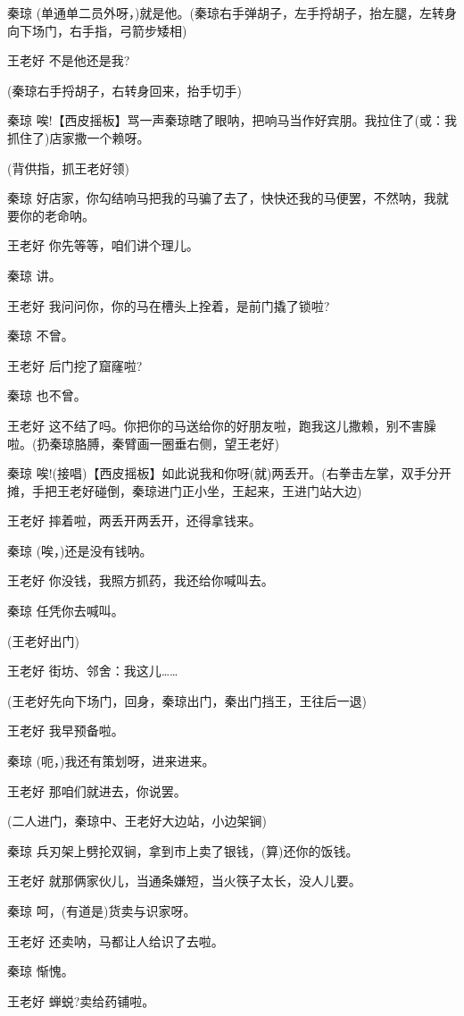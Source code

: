 秦琼
(单通单二员外呀，)就是他。(秦琼右手弹胡子，左手捋胡子，抬左腿，左转身向下场门，右手指，弓箭步矮相)

王老好 不是他还是我?

(秦琼右手捋胡子，右转身回来，抬手切手)

秦琼
唉!【西皮摇板】骂一声秦琼瞎了眼呐，把响马当作好宾朋。我拉住了(或：我抓住了)店家撒一个赖呀。

(背供指，抓王老好领)

秦琼
好店家，你勾结响马把我的马骗了去了，快快还我的马便罢，不然呐，我就要你的老命呐。

王老好 你先等等，咱们讲个理儿。

秦琼 讲。

王老好 我问问你，你的马在槽头上拴着，是前门撬了锁啦?

秦琼 不曾。

王老好 后门挖了窟窿啦?

秦琼 也不曾。

王老好
这不结了吗。你把你的马送给你的好朋友啦，跑我这儿撒赖，别不害臊啦。(扔秦琼胳膊，秦臂画一圈垂右侧，望王老好)

秦琼
唉!(接唱)【西皮摇板】如此说我和你呀(就)两丢开。(右拳击左掌，双手分开摊，手把王老好碰倒，秦琼进门正小坐，王起来，王进门站大边)

王老好 摔着啦，两丢开两丢开，还得拿钱来。

秦琼 (唉，)还是没有钱呐。

王老好 你没钱，我照方抓药，我还给你喊叫去。

秦琼 任凭你去喊叫。

(王老好出门)

王老好 街坊、邻舍：我这儿\ldots{}\ldots{}

(王老好先向下场门，回身，秦琼出门，秦出门挡王，王往后一退)

王老好 我早预备啦。

秦琼 (呃，)我还有策划呀，进来进来。

王老好 那咱们就进去，你说罢。

(二人进门，秦琼中、王老好大边站，小边架锏)

秦琼 兵刃架上劈抡双锏，拿到市上卖了银钱，(算)还你的饭钱。

王老好 就那俩家伙儿，当通条嫌短，当火筷子太长，没人儿要。

秦琼 呵，(有道是)货卖与识家呀。

王老好 还卖呐，马都让人给识了去啦。

秦琼 惭愧。

王老好 蝉蜕?卖给药铺啦。

